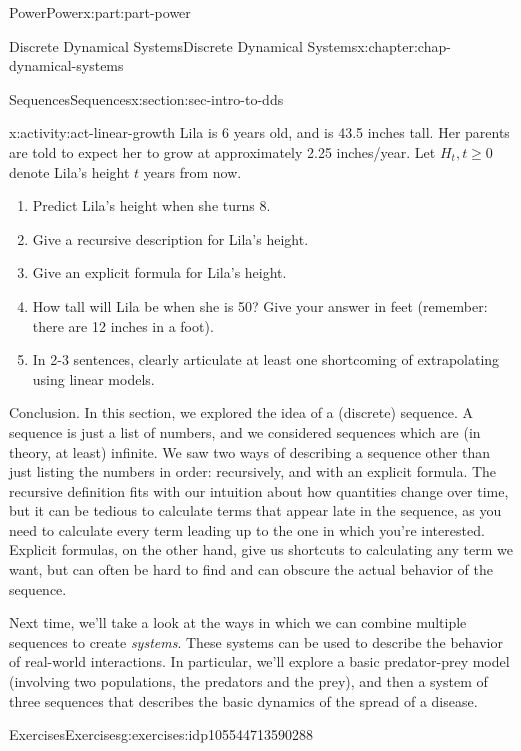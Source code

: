 \documentclass[oneside,10pt,]{book}
\numberwithin{equation}{section}
\renewcommand{\ge}{\geqslant}
\begin{document}
\begin{partptx}{Power}{}{Power}{}{}{x:part:part-power}
\begin{chapterptx}{Discrete Dynamical Systems}{}{Discrete Dynamical Systems}{}{}{x:chapter:chap-dynamical-systems}
\begin{sectionptx}{Sequences}{}{Sequences}{}{}{x:section:sec-intro-to-dds}
\begin{activity}{}{x:activity:act-linear-growth}%
Lila is 6 years old, and is 43.5 inches tall. Her parents are told to expect her to grow at approximately 2.25 inches\slash{}year. Let \(H_t, t\ge 0\) denote Lila's height \(t\) years from now.%
%
\begin{enumerate}
\item{}Predict Lila's height when she turns 8.%
\item{}Give a recursive description for Lila's height.%
\item{}Give an explicit formula for Lila's height.%
\item{}How tall will Lila be when she is 50? Give your answer in feet (remember: there are 12 inches in a foot).%
\item{}In 2-3 sentences, clearly articulate at least one shortcoming of extrapolating using linear models.%
\end{enumerate}
\end{activity}%
\begin{conclusion}{Conclusion.}%
In this section, we explored the idea of a (discrete) sequence. A sequence is just a list of numbers, and we considered sequences which are (in theory, at least) infinite. We saw two ways of describing a sequence other than just listing the numbers in order: recursively, and with an explicit formula. The recursive definition fits with our intuition about how quantities change over time, but it can be tedious to calculate terms that appear late in the sequence, as you need to calculate every term leading up to the one in which you're interested. Explicit formulas, on the other hand, give us shortcuts to calculating any term we want, but can often be hard to find and can obscure the actual behavior of the sequence.%
\par
Next time, we'll take a look at the ways in which we can combine multiple sequences to create \emph{systems}. These systems can be used to describe the behavior of real-world interactions. In particular, we'll explore a basic predator-prey model (involving two populations, the predators and the prey), and then a system of three sequences that describes the basic dynamics of the spread of a disease.%
\end{conclusion}%
%
%
\typeout{************************************************}
\typeout{************************************************}
%
\begin{exercises-subsection-numberless}{Exercises}{}{Exercises}{}{}{g:exercises:idp105544713590288}

\end{exercises-subsection-numberless}
\end{sectionptx}
\end{chapterptx}
\end{partptx}
\end{document}

